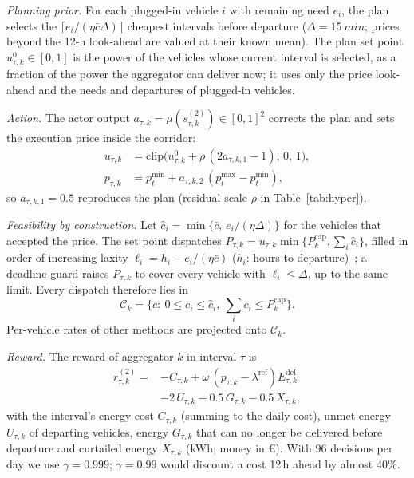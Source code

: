 \documentclass[journal]{IEEEtran}
\begin{document}
\emph{Planning prior.} For each plugged-in vehicle $i$ with remaining need
$e_i$, the plan selects the $\lceil e_i/(\eta\bar c\Delta)\rceil$ cheapest
intervals before departure ($\Delta=\SI{15}{min}$; prices beyond the 12-h
look-ahead are valued at their known mean). The plan set point
$u^0_{\tau,k}\in[0,1]$ is the power of the vehicles whose current interval is
selected, as a fraction of the power the aggregator can deliver now; it uses
only the price look-ahead and the needs and departures of plugged-in vehicles.

\emph{Action.} The actor output $a_{\tau,k}=\mu(s^{(2)}_{\tau,k})\in[0,1]^2$
corrects the plan and sets the execution price inside the corridor:
\begin{align}
u_{\tau,k}&=\mathrm{clip}\big(u^0_{\tau,k}+\rho\,(2a_{\tau,k,1}-1),\,0,\,1\big),
\label{eq:residual}\\
p_{\tau,k}&=p^{\min}_t+a_{\tau,k,2}\,(p^{\max}_t-p^{\min}_t),
\end{align}
so $a_{\tau,k,1}=0.5$ reproduces the plan (residual scale $\rho$ in
Table~\ref{tab:hyper}).

\emph{Feasibility by construction.} Let $\hat c_i=\min\{\bar c,\,e_i/(\eta\Delta)\}$
for the vehicles that accepted the price. The set point dispatches
$P_{\tau,k}=u_{\tau,k}\min\{P^{\mathrm{cap}}_k,\sum_i\hat c_i\}$, filled in
order of increasing laxity $\ell_i=h_i-e_i/(\eta\bar c)$ ($h_i$: hours to
departure)~\cite{xu2016priority}; a deadline guard raises $P_{\tau,k}$ to cover
every vehicle with $\ell_i\le\Delta$, up to the same limit. Every dispatch
therefore lies in
\begin{equation}
\mathcal{C}_k=\Big\{c:\ 0\le c_i\le\hat c_i,\ \textstyle\sum_i c_i\le P^{\mathrm{cap}}_k\Big\}.
\end{equation}
Per-vehicle rates of other methods are projected onto $\mathcal{C}_k$.

\emph{Reward.} The reward of aggregator $k$ in interval $\tau$ is
\begin{align}
r^{(2)}_{\tau,k}={}&-C_{\tau,k}+\omega\,(p_{\tau,k}-\lambda^{\mathrm{ref}})E^{\mathrm{del}}_{\tau,k}\nonumber\\
&-2\,U_{\tau,k}-0.5\,G_{\tau,k}-0.5\,X_{\tau,k},
\label{eq:r2}
\end{align}
with the interval's energy cost $C_{\tau,k}$ (summing to the daily cost), unmet
energy $U_{\tau,k}$ of departing vehicles, energy $G_{\tau,k}$ that can no
longer be delivered before departure and curtailed energy $X_{\tau,k}$ (kWh;
money in \euro). With 96 decisions per day we use $\gamma=0.999$; $\gamma=0.99$
would discount a cost 12\,h ahead by almost 40\%.
\end{document}
